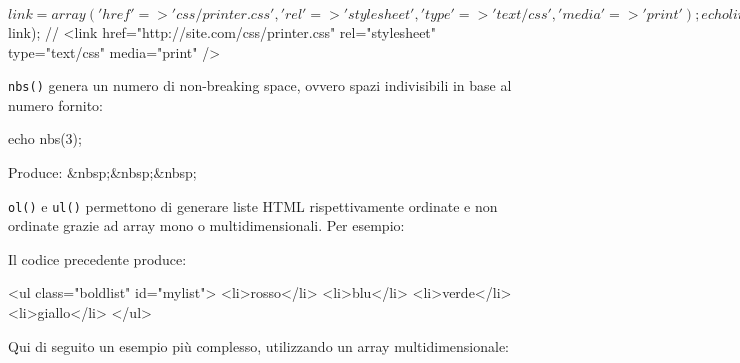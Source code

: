 \begin{code}
$link = array(
          'href' => 'css/printer.css',
          'rel' => 'stylesheet',
          'type' => 'text/css',
          'media' => 'print'
);

echo link_tag($link);
// <link href="http://site.com/css/printer.css" rel="stylesheet" type="text/css" media="print" />
\end{code}

\verb|nbs()| genera un numero di non-breaking space, ovvero spazi indivisibili  in base al numero fornito:

\begin{code}
echo nbs(3);
\end{code}

Produce: \&nbsp;\&nbsp;\&nbsp;

\verb|ol()| e \verb|ul()| permettono di generare liste HTML rispettivamente ordinate e non ordinate grazie ad array mono o multidimensionali. Per esempio:


Il codice precedente produce:

\begin{code}
<ul class="boldlist" id="mylist">
  <li>rosso</li>
  <li>blu</li>
  <li>verde</li>
  <li>giallo</li>
</ul>
\end{code}

Qui di seguito un esempio più complesso, utilizzando un array multidimensionale:


